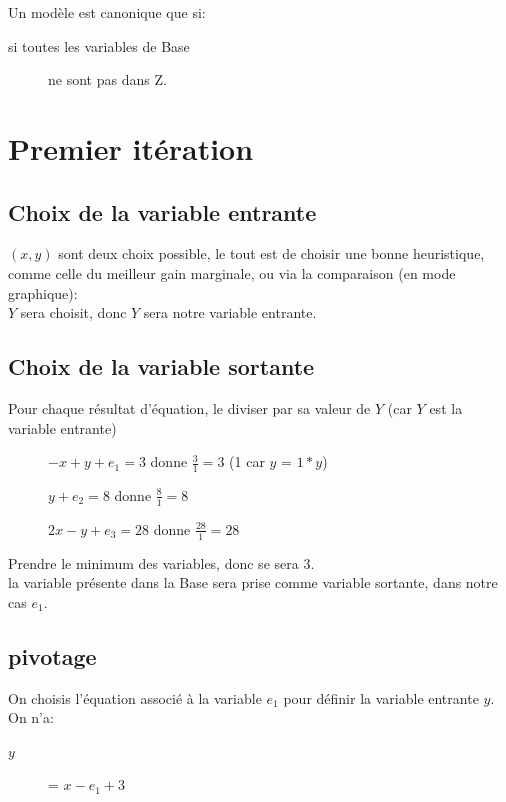 Un modèle est canonique que si:
\begin{description}
\item[si toutes les variables de Base] ne sont pas dans Z.
\end{description}

\section{Premier itération}
\subsection{Choix de la variable entrante}
$(x,y)$ sont deux choix possible, le tout est de choisir une bonne heuristique, comme celle du meilleur gain marginale, ou via la comparaison (en mode graphique):\\
$Y$ sera choisit, donc $Y$ sera notre variable entrante.\\

\subsection{Choix de la variable sortante}
Pour chaque résultat d'équation, le diviser par sa valeur de $Y$ (car $Y$ est la variable entrante)\\
\pagebreak
\begin{description}
\item[] $ -x + y + e_1 = 3$ donne $\frac{3}{1} = 3$ (1 car $y$ = $1*y$)
\item[] $ y + e_2 = 8$ donne $\frac{8}{1} = 8$
\item[] $ 2x - y + e_3 = 28$ donne $\frac{28}{1} = 28$
\end{description}
Prendre le minimum des variables, donc se sera $3$.\\
la variable présente dans la Base sera prise comme variable sortante, dans notre cas $e_1$.\\

\subsection{pivotage}
On choisis l'équation associé à la variable $e_1$ pour définir la variable entrante $y$.\\
On n'a:
\begin{description}
\item[$y$] = $x - e_1 + 3$
\end{description}

